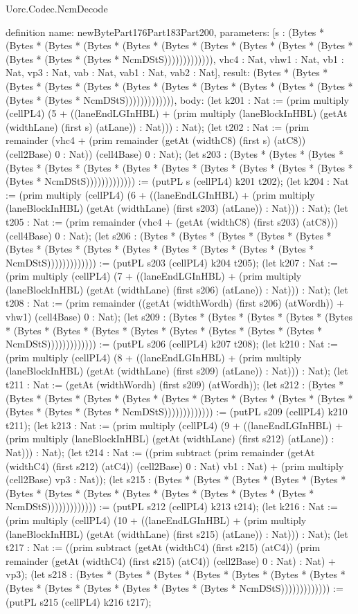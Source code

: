 \begin{lexlean}{Uorc.Codec.NcmDecode}
\begin{semanticmodule}
definition{
  name: newBytePart176Part183Part200,
  parameters: [s : (Bytes * (Bytes * (Bytes * (Bytes * (Bytes * (Bytes * (Bytes * (Bytes * (Bytes * (Bytes * (Bytes * (Bytes * (Bytes * NcmDStS))))))))))))), vhc4 : Nat, vhw1 : Nat, vb1 : Nat, vp3 : Nat, vab : Nat, vab1 : Nat, vab2 : Nat],
  result: (Bytes * (Bytes * (Bytes * (Bytes * (Bytes * (Bytes * (Bytes * (Bytes * (Bytes * (Bytes * (Bytes * (Bytes * (Bytes * NcmDStS))))))))))))),
  body: (let k201 : Nat := (prim multiply (cellPL4) (5 + ((laneEndLGInHBL) + (prim multiply (laneBlockInHBL) (getAt (widthLane) (first s) (atLane)) : Nat))) : Nat); (let t202 : Nat := (prim remainder (vhc4 + (prim remainder (getAt (widthC8) (first s) (atC8)) (cell2Base) 0 : Nat)) (cell4Base) 0 : Nat); (let s203 : (Bytes * (Bytes * (Bytes * (Bytes * (Bytes * (Bytes * (Bytes * (Bytes * (Bytes * (Bytes * (Bytes * (Bytes * (Bytes * NcmDStS))))))))))))) := (putPL s (cellPL4) k201 t202); (let k204 : Nat := (prim multiply (cellPL4) (6 + ((laneEndLGInHBL) + (prim multiply (laneBlockInHBL) (getAt (widthLane) (first s203) (atLane)) : Nat))) : Nat); (let t205 : Nat := (prim remainder (vhc4 + (getAt (widthC8) (first s203) (atC8))) (cell4Base) 0 : Nat); (let s206 : (Bytes * (Bytes * (Bytes * (Bytes * (Bytes * (Bytes * (Bytes * (Bytes * (Bytes * (Bytes * (Bytes * (Bytes * (Bytes * NcmDStS))))))))))))) := (putPL s203 (cellPL4) k204 t205); (let k207 : Nat := (prim multiply (cellPL4) (7 + ((laneEndLGInHBL) + (prim multiply (laneBlockInHBL) (getAt (widthLane) (first s206) (atLane)) : Nat))) : Nat); (let t208 : Nat := (prim remainder ((getAt (widthWordh) (first s206) (atWordh)) + vhw1) (cell4Base) 0 : Nat); (let s209 : (Bytes * (Bytes * (Bytes * (Bytes * (Bytes * (Bytes * (Bytes * (Bytes * (Bytes * (Bytes * (Bytes * (Bytes * (Bytes * NcmDStS))))))))))))) := (putPL s206 (cellPL4) k207 t208); (let k210 : Nat := (prim multiply (cellPL4) (8 + ((laneEndLGInHBL) + (prim multiply (laneBlockInHBL) (getAt (widthLane) (first s209) (atLane)) : Nat))) : Nat); (let t211 : Nat := (getAt (widthWordh) (first s209) (atWordh)); (let s212 : (Bytes * (Bytes * (Bytes * (Bytes * (Bytes * (Bytes * (Bytes * (Bytes * (Bytes * (Bytes * (Bytes * (Bytes * (Bytes * NcmDStS))))))))))))) := (putPL s209 (cellPL4) k210 t211); (let k213 : Nat := (prim multiply (cellPL4) (9 + ((laneEndLGInHBL) + (prim multiply (laneBlockInHBL) (getAt (widthLane) (first s212) (atLane)) : Nat))) : Nat); (let t214 : Nat := ((prim subtract (prim remainder (getAt (widthC4) (first s212) (atC4)) (cell2Base) 0 : Nat) vb1 : Nat) + (prim multiply (cell2Base) vp3 : Nat)); (let s215 : (Bytes * (Bytes * (Bytes * (Bytes * (Bytes * (Bytes * (Bytes * (Bytes * (Bytes * (Bytes * (Bytes * (Bytes * (Bytes * NcmDStS))))))))))))) := (putPL s212 (cellPL4) k213 t214); (let k216 : Nat := (prim multiply (cellPL4) (10 + ((laneEndLGInHBL) + (prim multiply (laneBlockInHBL) (getAt (widthLane) (first s215) (atLane)) : Nat))) : Nat); (let t217 : Nat := ((prim subtract (getAt (widthC4) (first s215) (atC4)) (prim remainder (getAt (widthC4) (first s215) (atC4)) (cell2Base) 0 : Nat) : Nat) + vp3); (let s218 : (Bytes * (Bytes * (Bytes * (Bytes * (Bytes * (Bytes * (Bytes * (Bytes * (Bytes * (Bytes * (Bytes * (Bytes * (Bytes * NcmDStS))))))))))))) := (putPL s215 (cellPL4) k216 t217); }
\end{semanticmodule}
\end{lexlean}
